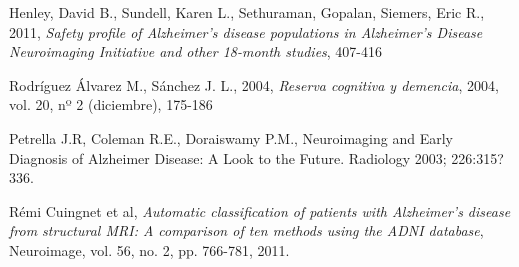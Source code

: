 \begin{thebibliography}{9}

	Henley, David B.,
	Sundell, Karen L.,
	Sethuraman, Gopalan,
 	Siemers, Eric R.,
	2011,	
	\textit{Safety profile of Alzheimer's disease populations in Alzheimer's Disease Neuroimaging Initiative and other 18-month studies},
 	407-416


	Rodríguez Álvarez M., Sánchez J. L.,
	2004,
	\textit{Reserva cognitiva y demencia},
	2004, vol. 20, nº 2 (diciembre), 175-186 
	
 Petrella J.R, Coleman R.E., Doraiswamy P.M., Neuroimaging and Early Diagnosis
of Alzheimer Disease: A Look to the Future. Radiology 2003; 226:315?336.



	Rémi Cuingnet et al, 
	\textit{Automatic classification of patients with Alzheimer's disease from
	structural MRI: A comparison of ten methods using the ADNI database},
	 Neuroimage,
	vol. 56, no. 2, pp. 766-781, 2011.

  \end{thebibliography}
